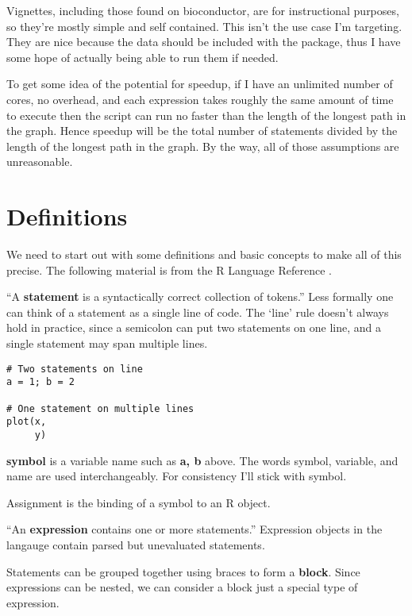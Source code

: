 \documentclass[12pt]{article}
\begin{document}
Vignettes, including those found on bioconductor, are for instructional
purposes, so they're mostly simple and self contained. This isn't the use
case I'm targeting. They are nice because the data should be included with
the package, thus I have some hope of actually being able to run them if
needed.

To get some idea of the potential for speedup, if I have an unlimited
number of cores, no overhead, and each expression takes roughly the same
amount of time to execute then the script can run no faster than the length
of the longest path in the graph. Hence speedup will be the total number
of statements divided by the length of the longest path in the graph.
By the way, all of those assumptions are unreasonable.


\appendix
\section{Definitions}

We need to start out with some definitions and basic concepts to make all
of this precise. The following material is from the R
Language Reference \cite{Rlang}.

``A \textbf{statement} is a
syntactically correct collection of tokens.'' Less formally one can think of
a statement as a single line of code. The `line' rule doesn't always hold in practice,
since a semicolon can put two statements on one line, and a single
statement may span multiple lines.

\begin{verbatim}
# Two statements on line
a = 1; b = 2

# One statement on multiple lines
plot(x,
     y)
\end{verbatim}

\textbf{symbol} is a variable name such as \textbf{a, b} above.  The words
symbol, variable, and name are used interchangeably. For consistency I'll
stick with symbol.

Assignment is the binding of a symbol to an R object.

``An \textbf{expression} contains one or more statements.'' Expression objects
in the langauge contain parsed but unevaluated statements. 

Statements can be grouped together using braces to form a \textbf{block}.
Since expressions can be nested, we can consider a block just a special
type of expression.
\end{document}
